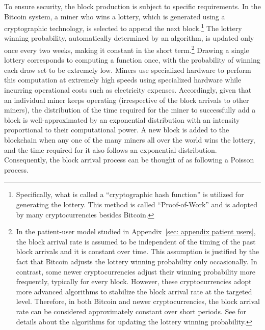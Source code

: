 \documentclass[12pt, letterpaper]{article}
\begin{document}
To ensure security, the block production is subject to specific requirements. In the Bitcoin system, a miner who wins a lottery, which is generated using a cryptographic technology, is selected to append the next block.\footnote{Specifically, what is called a ``cryptographic hash function'' is utilized for generating the lottery. This method is called ``Proof-of-Work'' and is adopted by many cryptocurrencies besides Bitcoin.} The lottery winning probability, automatically determined by an algorithm, is updated only once every two weeks, making it constant in the short term.\footnote{In the patient-user model studied in Appendix~\ref{sec: appendix patient users}, the block arrival rate is assumed to be independent of the timing of the past block arrivals and it is constant over time. This assumption is justified by the fact that Bitcoin adjusts the lottery winning probability only occasionally. In contrast, some newer cryptocurrencies adjust their winning probability more frequently, typically for every block. However, these cryptocurrencies adopt more advanced algorithms to stabilize the block arrival rate at the targeted level. Therefore, in both Bitcoin and newer cryptocurrencies, the block arrival rate can be considered approximately constant over short periods. See \citet{noda2020difficulty,kawaguchi2022miners} for details about the algorithms for updating the lottery winning probability.} Drawing a single lottery corresponds to computing a function once, with the probability of winning each draw set to be extremely low. Miners use specialized hardware to perform this computation at extremely high speeds using specialized hardware while incurring operational costs such as electricity expenses. Accordingly, given that an individual miner keeps operating (irrespective of the block arrivals to other miners), the distribution of the time required for the miner to successfully add a block is well-approximated by an exponential distribution with an intensity proportional to their computational power. A new block is added to the blockchain when any one of the many miners all over the world wins the lottery, and the time required for it also follows an exponential distribution. Consequently, the block arrival process can be thought of as following a Poisson process.
\end{document}
